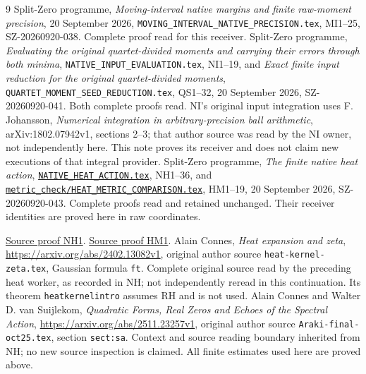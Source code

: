 \documentclass[11pt]{article}
\begin{document}
\begin{thebibliography}{9}
 Split-Zero programme, \emph{Moving-interval native margins
and finite raw-moment precision}, 20 September 2026,
\texttt{MOVING\_INTERVAL\_NATIVE\_PRECISION.tex}, MI1--25,
SZ-20260920-038. Complete proof read for this receiver.
 Split-Zero programme, \emph{Evaluating the original
quartet-divided moments and carrying their errors through both minima},
\texttt{NATIVE\_INPUT\_EVALUATION.tex}, NI1--19, and
\emph{Exact finite input reduction for the original quartet-divided moments},
\texttt{QUARTET\_MOMENT\_SEED\_REDUCTION.tex}, QS1--32,
20 September 2026, SZ-20260920-041. Both complete proofs read.
NI's original input integration uses F. Johansson,
\emph{Numerical integration in arbitrary-precision ball arithmetic},
arXiv:1802.07942v1, sections 2--3; that author source was read by the
NI owner, not independently here. This note proves its receiver and
does not claim new executions of that integral provider.
 Split-Zero programme, \emph{The finite native heat action},
\href{https://github.com/KokunoYumeto/zeta-function-research-reader/blob/5992ad50c0f2a06921f1fcaded7b4e38097c0739/workbenches/splitzero-tandem/continuations/20260920-original-kernel-mixed-determinants/providers/NATIVE_HEAT_ACTION.tex\#L1}{\texttt{NATIVE\_HEAT\_ACTION.tex}}, NH1--36, and
\href{https://github.com/KokunoYumeto/zeta-function-research-reader/blob/5992ad50c0f2a06921f1fcaded7b4e38097c0739/workbenches/splitzero-tandem/continuations/20260920-original-kernel-mixed-determinants/providers/HEAT_METRIC_COMPARISON.tex\#L1}{\texttt{metric\_check/HEAT\_METRIC\_COMPARISON.tex}}, HM1--19,
20 September 2026, SZ-20260920-043. Complete proofs read and retained
unchanged. Their receiver identities are proved here in raw coordinates.

\href{https://github.com/KokunoYumeto/zeta-function-research-reader/blob/5992ad50c0f2a06921f1fcaded7b4e38097c0739/workbenches/splitzero-tandem/continuations/20260920-original-kernel-mixed-determinants/providers/NATIVE_HEAT_ACTION.tex\#L41}{Source proof NH1}. \href{https://github.com/KokunoYumeto/zeta-function-research-reader/blob/5992ad50c0f2a06921f1fcaded7b4e38097c0739/workbenches/splitzero-tandem/continuations/20260920-original-kernel-mixed-determinants/providers/HEAT_METRIC_COMPARISON.tex\#L43}{Source proof HM1}.
 Alain Connes, \emph{Heat expansion and zeta},
\url{https://arxiv.org/abs/2402.13082v1}, original author source
\texttt{heat-kernel-zeta.tex}, Gaussian formula \texttt{ft}.
Complete original source read by the preceding heat worker, as recorded
in NH; not independently reread in this continuation. Its theorem
\texttt{heatkernelintro} assumes RH and is not used.
 Alain Connes and Walter D. van Suijlekom,
\emph{Quadratic Forms, Real Zeros and Echoes of the Spectral Action},
\url{https://arxiv.org/abs/2511.23257v1}, original author source
\texttt{Araki-final-oct25.tex}, section \texttt{sect:sa}.
Context and source reading boundary inherited from NH; no new source
inspection is claimed. All finite estimates used here are proved above.
\end{thebibliography}
\end{document}
